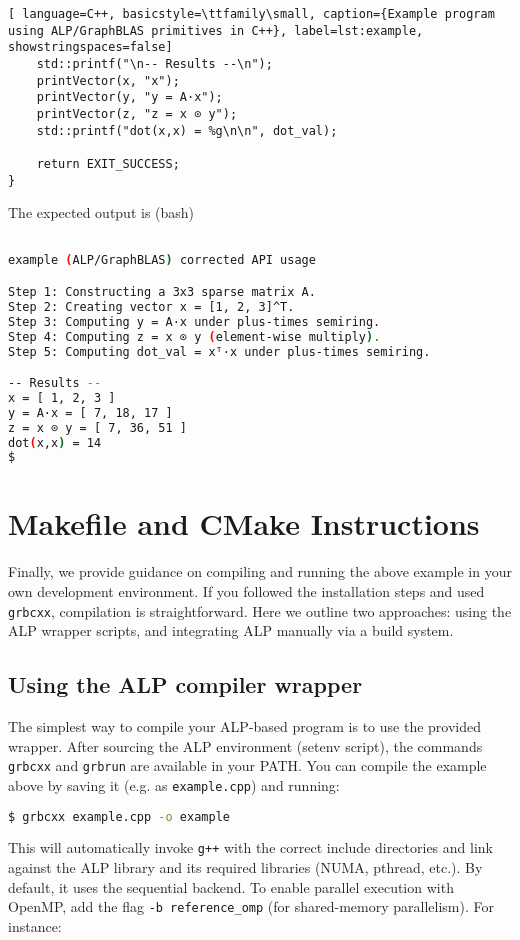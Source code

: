 \begin{lstlisting}[ language=C++, basicstyle=\ttfamily\small, caption={Example program using ALP/GraphBLAS primitives in C++}, label=lst:example, showstringspaces=false]
    std::printf("\n-- Results --\n");
    printVector(x, "x");
    printVector(y, "y = A·x");
    printVector(z, "z = x ⊙ y");
    std::printf("dot(x,x) = %g\n\n", dot_val);

    return EXIT_SUCCESS;
}
\end{lstlisting}

The expected output is (bash)

\begin{lstlisting}[language=bash]

example (ALP/GraphBLAS) corrected API usage

Step 1: Constructing a 3x3 sparse matrix A.
Step 2: Creating vector x = [1, 2, 3]^T.
Step 3: Computing y = A·x under plus‐times semiring.
Step 4: Computing z = x ⊙ y (element‐wise multiply).
Step 5: Computing dot_val = xᵀ·x under plus‐times semiring.

-- Results --
x = [ 1, 2, 3 ]
y = A·x = [ 7, 18, 17 ]
z = x ⊙ y = [ 7, 36, 51 ]
dot(x,x) = 14
$
\end{lstlisting}



\section{Makefile and CMake Instructions}\label{sec:build_instructions}

Finally, we provide guidance on compiling and running the above example in your own development environment. If you followed the installation steps and used \texttt{grbcxx}, compilation is straightforward. Here we outline two approaches: using the ALP wrapper scripts, and integrating ALP manually via a build system.

\subsection*{Using the ALP compiler wrapper}

The simplest way to compile your ALP-based program is to use the provided wrapper. After sourcing the ALP environment (setenv script), the commands \texttt{grbcxx} and \texttt{grbrun} are available in your PATH. You can compile the example above by saving it (e.g. as \texttt{example.cpp}) and running:
\begin{lstlisting}[language=bash]
$ grbcxx example.cpp -o example
\end{lstlisting}
This will automatically invoke \texttt{g++} with the correct include directories and link against the ALP library and its required libraries (NUMA, pthread, etc.). By default, it uses the sequential backend. To enable parallel execution with OpenMP, add the flag \texttt{-b reference\_omp} (for shared-memory parallelism). For instance:


